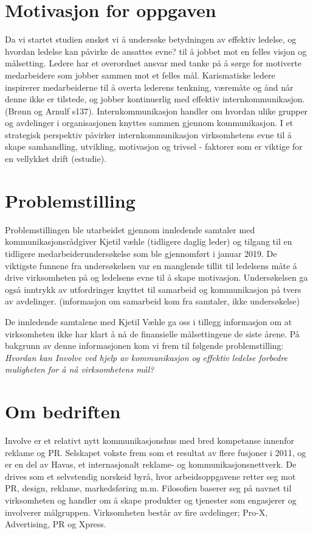 \section{Motivasjon for oppgaven}
Da vi startet studien ønsket vi å undersøke betydningen av effektiv ledelse, og hvordan ledelse kan påvirke de ansattes evne? til å jobbet mot en felles visjon og målsetting. Ledere har et overordnet ansvar med tanke på å sørge for motiverte medarbeidere som jobber sammen mot et felles mål. Karismatiske ledere inspirerer medarbeiderne til å overta lederens tenkning, væremåte og  ånd når denne ikke er tilstede, og jobber kontinuerlig med effektiv internkommunikasjon.(Brønn og Arnulf s137). Internkommunikasjon handler om hvordan ulike grupper og avdelinger i organisasjonen knyttes sammen gjennom kommunikasjon. I et strategisk perspektiv påvirker internkommunikasjon virksomhetens evne til å skape samhandling, utvikling, motivasjon og trivsel - faktorer som er viktige for en vellykket drift (estudie).

\section{Problemstilling}
Problemstillingen ble utarbeidet gjennom innledende samtaler med kommunikasjonsrådgiver Kjetil væhle (tidligere daglig leder) og tilgang til en tidligere medarbeiderundersøkelse som ble gjennomført i januar 2019. De viktigste funnene fra undersøkelsen var en manglende tillit til ledelsens måte å drive virksomheten på og ledelsens evne til å skape motivasjon. Undersøkelsen ga også inntrykk av utfordringer knyttet til samarbeid og kommunikasjon på tvers av avdelinger. (informasjon om samarbeid kom fra samtaler, ikke undersøkelse) 

\indent \newline
De innledende samtalene med Kjetil Væhle ga oss i tillegg informasjon om at virksomheten ikke har klart å nå de finansielle målsettingene de siste årene. På bakgrunn av denne informasjonen kom vi frem til følgende problemstilling:
\textit{Hvordan kan Involve ved hjelp av kommunikasjon og effektiv ledelse forbedre muligheten for å nå virksomhetens mål?} 

\section{Om bedriften}
Involve er et relativt nytt kommunikasjonshus med bred kompetanse innenfor reklame og PR. Selskapet vokste frem som et resultat av flere fusjoner i 2011, og er en del av Havas, et internasjonalt reklame- og kommunikasjonsnettverk. De drives som et selvstendig norskeid byrå, hvor arbeidsoppgavene retter seg mot PR, design, reklame, markedsføring m.m. Filosofien baserer seg på navnet til virksomheten og handler om å skape produkter og tjenester som engasjerer og involverer målgruppen. Virksomheten består av fire avdelinger; Pro-X, Advertising, PR og Xpress.

